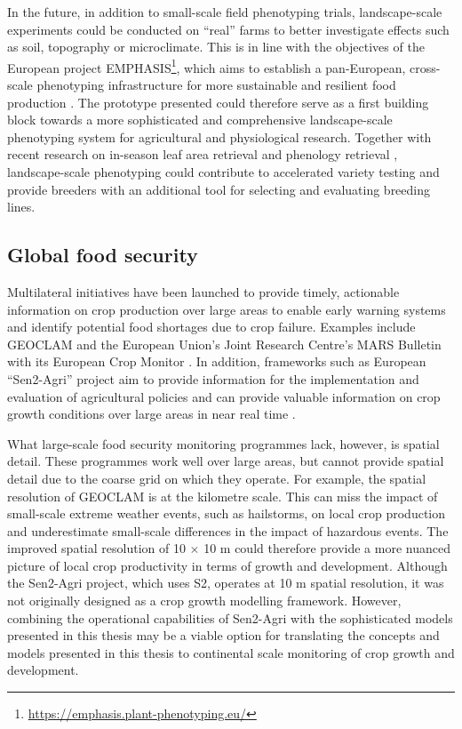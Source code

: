 In the future, in addition to small-scale field phenotyping trials, landscape-scale experiments could be conducted on ``real'' farms to better investigate effects such as soil, topography or microclimate. This is in line with the objectives of the European project EMPHASIS\footnote{\url{https://emphasis.plant-phenotyping.eu/}}, which aims to establish a pan-European, cross-scale phenotyping infrastructure for more sustainable and resilient food production \citep{pieruschka_plant_2019}. The prototype presented could therefore serve as a first building block towards a more sophisticated and comprehensive landscape-scale phenotyping system for agricultural and physiological research. Together with recent research on in-season leaf area retrieval \citep{li_daily_2024} and phenology retrieval \citep{liao_near_2023}, landscape-scale phenotyping could contribute to accelerated variety testing and provide breeders with an additional tool for selecting and evaluating breeding lines.

\subsection{Global food security}

Multilateral initiatives have been launched to provide timely, actionable information on crop production over large areas to enable early warning systems and identify potential food shortages due to crop failure. Examples include \gls{GEOCLAM} \citep{whitcraft_no_2019} and the European Union's Joint Research Centre's MARS Bulletin with its European Crop Monitor \citep{van_der_velde_use_2019}. In addition, frameworks such as European ``Sen2-Agri'' project aim to provide information for the implementation and evaluation of agricultural policies and can provide valuable information on crop growth conditions over large areas in near real time \citep{defourny_near_2019}.

What large-scale food security monitoring programmes lack, however, is spatial detail. These programmes work well over large areas, but cannot provide spatial detail due to the coarse grid on which they operate. For example, the spatial resolution of  \gls{GEOCLAM} is at the kilometre scale. This can miss the impact of small-scale extreme weather events, such as hailstorms, on local crop production and underestimate small-scale differences in the impact of hazardous events. The improved spatial resolution of 10 $\times$ 10 m could therefore provide a more nuanced picture of local crop productivity in terms of growth and development. Although the Sen2-Agri project, which uses \gls{S2}, operates at 10 m spatial resolution, it was not originally designed as a crop growth modelling framework. However, combining the operational capabilities of Sen2-Agri with the sophisticated models presented in this thesis may be a viable option for translating the concepts and models presented in this thesis to continental scale monitoring of crop growth and development.

